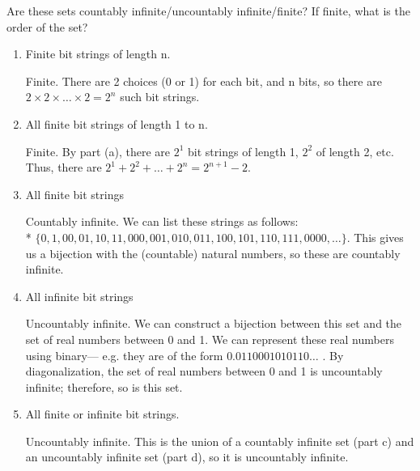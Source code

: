 \question Are these sets countably infinite/uncountably infinite/finite? If finite, what is the order of the set?
\begin{enumerate}[label=(\alph*)]
\item
Finite bit strings of length n.
\begin{solution}
Finite. There are 2 choices (0 or 1) for each bit, and n bits, so 
there are $2 \times 2 \times \ldots \times 2 = 2^n$ such bit strings.
\end{solution}
\item
All finite bit strings of length 1 to n.
\begin{solution}
Finite. By part (a), there are $2^1$ bit strings of length 1, $2^2$ of 
length 2, etc. Thus, there are $2^1 + 2^2 + \ldots + 2^n = 2^{n + 1}- 2$.
\end{solution}
\item
All finite bit strings
\begin{solution}
Countably infinite. We can list these strings as follows: \\*
$\{0, 1, 00, 01, 10, 11, 000, 001, 010, 011, 100, 101, 110, 111, 0000, \ldots\}$. 
This gives us a bijection with the (countable) natural numbers, so 
these are countably infinite.
\end{solution}
\item
All infinite bit strings
\begin{solution}
Uncountably infinite. We can construct a bijection between this set 
and the set of real numbers between 0 and 1. We can represent these 
real numbers using binary— e.g. they are of the form $0.0110001010110\dots$
. By diagonalization, the set of real numbers between 0 and 1 is 
uncountably infinite; therefore, so is this set.
\end{solution}
\item
All finite or infinite bit strings.
\begin{solution}
Uncountably infinite. This is the union of a countably infinite set 
(part c) and an uncountably infinite set (part d), so it is uncountably 
infinite.
\end{solution}
\end{enumerate}
